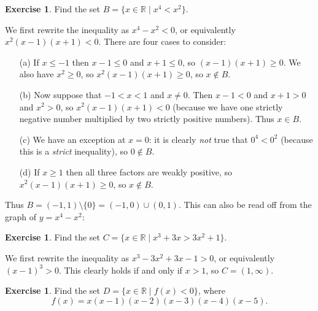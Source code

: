 \documentclass[a4paper]{book}
\newcommand{\RED}[1]{{\color{red}#1}}
\newcommand{\R}         {{\mathbb{R}}}
\newcommand{\sm}        {\setminus}
\newcommand{\st}        {\;|\;}
\renewcommand{\:}{\colon}
\newcommand{\EMPH}[1]{\RED{\emph{#1}}}
\theoremstyle{definition}
\newtheorem{exercise}[theorem]{Exercise}
\renewenvironment{solution}{\SolutionInline}{\endSolutionInline}
\begin{document}
\begin{exercise}
 Find the set $B=\{x\in\R\st x^4<x^2\}$.
\end{exercise}
\begin{solution}
 We first rewrite the inequality as $x^4-x^2<0$, or equivalently
 $x^2(x-1)(x+1)<0$.  There are four cases to consider:
 \begin{itemize}
  \item[(a)] If $x\leq -1$ then $x-1\leq 0$ and $x+1\leq 0$, so
   $(x-1)(x+1)\geq 0$.  We also have $x^2\geq 0$, so
   $x^2(x-1)(x+1)\geq 0$, so $x\not\in B$.
  \item[(b)] Now suppose that $-1<x<1$ and $x\neq 0$.  Then $x-1<0$
   and $x+1>0$ and $x^2>0$, so $x^2(x-1)(x+1)<0$ (because we have one
   strictly negative number multiplied by two strictly positive
   numbers).  Thus $x\in B$.
  \item[(c)] We have an exception at $x=0$: it is clearly \EMPH{not}
   true that $0^4<0^2$ (because this is a \EMPH{strict} inequality),
   so $0\not\in B$.
  \item[(d)] If $x\geq 1$ then all three factors are weakly positive,
   so $x^2(x-1)(x+1)\geq 0$, so $x\not\in B$.
 \end{itemize}
 Thus $B=(-1,1)\sm\{0\}=(-1,0)\cup(0,1)$.
 This can also be read off from the graph of $y=x^4-x^2$:
 \begin{center}
 \end{center}
\end{solution}
\begin{exercise}
 Find the set $C=\{x\in\R\st x^3+3x>3x^2+1\}$.
\end{exercise}
\begin{solution}
 We first rewrite the inequality as $x^3-3x^2+3x-1>0$, or equivalently
 $(x-1)^3>0$.  This clearly holds if and only if $x>1$, so
 $C=(1,\infty)$. 
\end{solution}
\begin{exercise}
 Find the set $D=\{x\in\R\st f(x)<0\}$, where 
 \[ f(x)=x(x-1)(x-2)(x-3)(x-4)(x-5). \]
\end{exercise}
\end{document}
